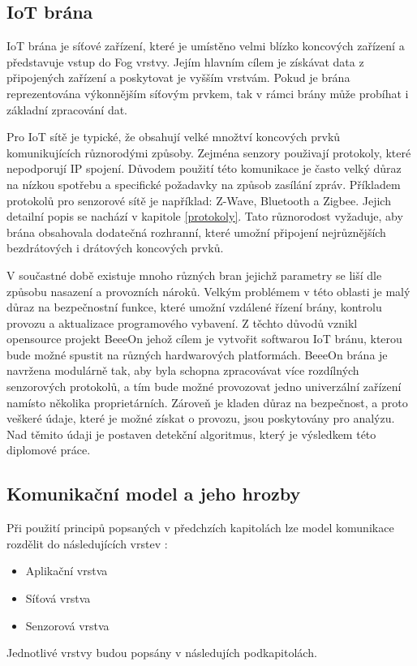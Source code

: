  \subsection{IoT brána} 
 IoT brána je síťové zařízení, které je umístěno velmi blízko koncových zařízení
 a představuje vstup do Fog vrstvy. Jejím hlavním cílem je získávat data 
 z připojených zařízení a poskytovat je vyšším vrstvám. Pokud je brána reprezentována
 výkonnějším síťovým prvkem, tak v rámci brány může probíhat i základní zpracování
 dat. 
 
 Pro IoT sítě je typické, že obsahují velké množtví koncových prvků komunikujících
 různorodými způsoby. Zejména senzory použivají protokoly, které nepodporují
 IP spojení. Důvodem použití této komunikace je často velký
 důraz na nízkou spotřebu a specifické požadavky na způsob zasílání zpráv.
 Příkladem protokolů pro senzorové sítě je například:
 Z-Wave, Bluetooth a Zigbee. Jejich detailní popis se nachází v kapitole \ref{protokoly}.
 Tato různorodost vyžaduje, aby brána obsahovala dodatečná rozhranní, které 
 umožní připojení nejrůznějších bezdrátových i drátových koncových prvků. 
 
 V součastné době existuje mnoho různých bran jejichž parametry se liší dle 
 způsobu nasazení a provozních nároků. Velkým problémem v této oblasti je malý 
 důraz na bezpečnostní funkce, které umožní vzdálené řízení brány, kontrolu provozu a 
 aktualizace programového vybavení. Z těchto důvodů vznikl opensource projekt BeeeOn \cite{beeeon}
 jehož cílem je vytvořit softwarou IoT bránu, kterou bude možné spustit na různých 
 hardwarových platformách. BeeeOn brána je navržena modulárně tak, aby byla schopna 
 zpracovávat více rozdílných senzorových protokolů, a tím bude možné provozovat jedno
 univerzální zařízení namísto několika proprietárních. Zároveň je kladen důraz na bezpečnost, 
 a proto veškeré údaje, které je možné získat o provozu, jsou poskytovány pro analýzu. Nad těmito údaji
 je postaven detekční algoritmus, který je výsledkem této diplomové práce.
 

 \subsection{Komunikační model a jeho hrozby}
 Při použití principů popsaných v předchzích kapitolách lze model komunikace rozdělit
 do následujících vrstev \cite{iotSurvey}:
 \begin{itemize}
 \item Aplikační vrstva 
 \item Síťová vrstva
 \item Senzorová vrstva
\end{itemize}
 Jednotlivé vrstvy budou popsány v následujích podkapitolách.
 
